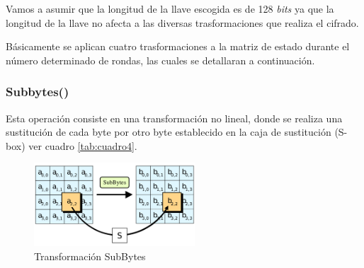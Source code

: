 \documentclass[peerreview]{IEEEtran}
\begin{document}
Vamos a asumir que la longitud de la llave escogida es de 128 \textit{bits} ya que la longitud de la llave no afecta a las diversas trasformaciones que realiza el cifrado.
\begin{table}[h]
\centering
{}
\caption{Número de rondas en función de la longitud de la llave}
\label{tab:cuadro3}
\end{table}


Básicamente se aplican cuatro trasformaciones a la matriz de estado durante el número determinado de rondas, las cuales se detallaran a continuación.
\bigbreak
\subsubsection{Subbytes()}
Esta operación consiste en una transformación no lineal, donde se realiza una sustitución de cada byte por otro byte establecido en la caja de sustitución (S-box) ver cuadro \ref{tab:cuadro4}.
\begin{figure}[h]
\includegraphics[width=6cm]{figuras/SubBytes.png}
\centering
\caption{Transformación SubBytes}
\label{fig: 3}
\end{figure}
\end{document}
